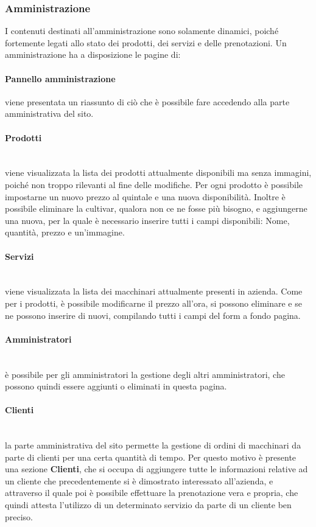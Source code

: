 \subsubsection{Amministrazione}
I contenuti destinati all'amministrazione sono solamente dinamici, poiché fortemente legati allo stato dei prodotti, dei servizi e delle prenotazioni. Un amministrazione ha a disposizione le pagine di:
\paragraph{Pannello amministrazione} viene presentata un riassunto di ciò che è possibile fare accedendo alla parte amministrativa del sito.
\paragraph{Prodotti}
~\\viene visualizzata la lista dei prodotti attualmente disponibili ma senza immagini, poiché non troppo rilevanti al fine delle modifiche. Per ogni prodotto è possibile impostarne un nuovo prezzo al quintale e una nuova disponibilità. Inoltre è possibile eliminare la cultivar, qualora non ce ne fosse più bisogno, e aggiungerne una nuova, per la quale è necessario inserire tutti i campi disponibili: Nome, quantità, prezzo e un'immagine.
\paragraph{Servizi}
~\\viene visualizzata la lista dei macchinari attualmente presenti in azienda. Come per i prodotti, è possibile modificarne il prezzo all'ora, si possono eliminare e se ne possono inserire di nuovi, compilando tutti i campi del form a fondo pagina.
\paragraph{Amministratori}
~\\è possibile per gli amministratori la gestione degli altri amministratori, che possono quindi essere aggiunti o eliminati in questa pagina.
\paragraph{Clienti}
~\\la parte amministrativa del sito permette la gestione di ordini di macchinari da parte di clienti per una certa quantità di tempo. Per questo motivo è presente una sezione \textbf{Clienti}, che si occupa di aggiungere tutte le informazioni relative ad un cliente che precedentemente si è dimostrato interessato all'azienda, e attraverso il quale poi è possibile effettuare la prenotazione vera e propria, che quindi attesta l'utilizzo di un determinato servizio da parte di un cliente ben preciso.
